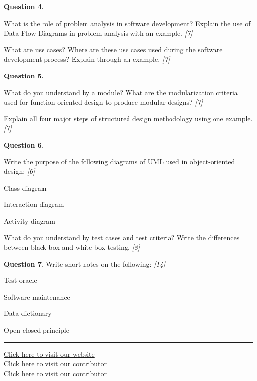 \documentclass[11pt,a4paper]{article}
\newcommand{\pts}[1]{\hfill\textit{[#1]}}
\begin{document}
\medskip\noindent\textbf{Question 4.}
\begin{parts}
  \item What is the role of problem analysis in software development? Explain the use of Data Flow Diagrams in problem analysis with an example. \pts{7}
  \item What are use cases? Where are these use cases used during the software development process? Explain through an example. \pts{7}
\end{parts}

\medskip\noindent\textbf{Question 5.}
\begin{parts}
  \item What do you understand by a module? What are the modularization criteria used for function-oriented design to produce modular designs? \pts{7}
  \item Explain all four major steps of structured design methodology using one example. \pts{7}
\end{parts}

\medskip\noindent\textbf{Question 6.}
\begin{parts}
  \item Write the purpose of the following diagrams of UML used in object-oriented design: \pts{6}
  \begin{parts}
    \item Class diagram
    \item Interaction diagram
    \item Activity diagram
  \end{parts}
  \item What do you understand by test cases and test criteria? Write the differences between black-box and white-box testing. \pts{8}
\end{parts}

\medskip\noindent\textbf{Question 7.} Write short notes on the following: \pts{14}
\begin{parts}
  \item Test oracle
  \item Software maintenance
  \item Data dictionary
  \item Open-closed principle
\end{parts}

\vfill
\rule{\linewidth}{0.4pt}
\begin{center}\small
\href{https://bhu-exam.vercel.app/}{Click here to visit our website}\\[4pt]\href{https://me-aryan.vercel.app/}{Click here to visit our contributor}\\[4pt]\href{https://quashan-me.vercel.app/}{Click here to visit our contributor}
\end{center}
\end{document}
